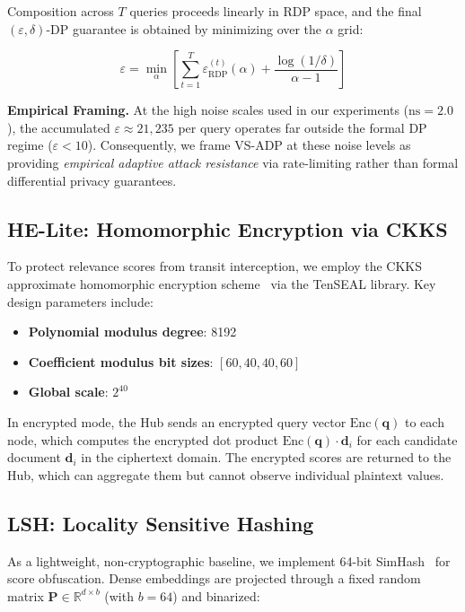 \documentclass[conference]{IEEEtran}
\begin{document}
Composition across $T$ queries proceeds linearly in RDP space, and the final $(\varepsilon, \delta)$-DP guarantee is obtained by minimizing over the $\alpha$ grid:

\begin{equation}
    \varepsilon = \min_{\alpha} \left[\sum_{t=1}^{T} \varepsilon_{\text{RDP}}^{(t)}(\alpha) + \frac{\log(1/\delta)}{\alpha - 1}\right]
\end{equation}

\textbf{Empirical Framing.} At the high noise scales used in our experiments ($\text{ns}=2.0$), the accumulated $\varepsilon \approx 21{,}235$ per query operates far outside the formal DP regime ($\varepsilon < 10$). Consequently, we frame VS-ADP at these noise levels as providing \textit{empirical adaptive attack resistance} via rate-limiting rather than formal differential privacy guarantees.

\subsection{HE-Lite: Homomorphic Encryption via CKKS}

To protect relevance scores from transit interception, we employ the CKKS approximate homomorphic encryption scheme~\cite{cheon2017homomorphic} via the TenSEAL library. Key design parameters include:

\begin{itemize}
    \item \textbf{Polynomial modulus degree}: 8192
    \item \textbf{Coefficient modulus bit sizes}: $[60, 40, 40, 60]$
    \item \textbf{Global scale}: $2^{40}$
\end{itemize}

In encrypted mode, the Hub sends an encrypted query vector $\text{Enc}(\mathbf{q})$ to each node, which computes the encrypted dot product $\text{Enc}(\mathbf{q}) \cdot \mathbf{d}_i$ for each candidate document $\mathbf{d}_i$ in the ciphertext domain. The encrypted scores are returned to the Hub, which can aggregate them but cannot observe individual plaintext values.

\subsection{LSH: Locality Sensitive Hashing}

As a lightweight, non-cryptographic baseline, we implement 64-bit SimHash~\cite{charikar2002similarity} for score obfuscation. Dense embeddings are projected through a fixed random matrix $\mathbf{P} \in \mathbb{R}^{d \times b}$ (with $b=64$) and binarized:
\end{document}
